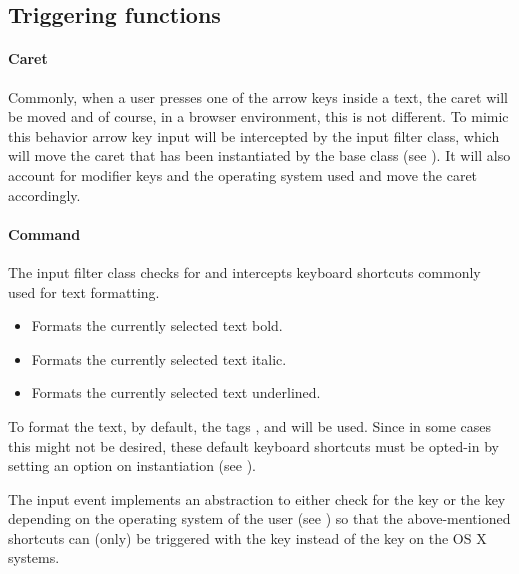 


\subsection{Triggering functions}

\paragraph{Caret} Commonly, when a user presses one of the arrow keys inside a text, the caret will be moved and of course, in a browser environment, this is not different. To mimic this behavior arrow key input will be intercepted by the  input filter class, which will move the caret that has been instantiated by the  base class (see ). It will also account for modifier keys and the operating system used and move the caret accordingly.


\paragraph{Command} The  input filter class checks for and intercepts keyboard shortcuts commonly used for text formatting. 

\begin{itemize}
\item {} Formats the currently selected text bold.
\item {} Formats the currently selected text italic. 
\item {} Formats the currently selected text underlined.
\end{itemize}

To format the text, by default, the tags ,  and  will be used. Since in some cases this might not be desired, these default keyboard shortcuts must be opted-in by setting an option on instantiation (see ).

The input event implements an abstraction to either check for the  key or the  key depending on the operating system of the user (see ) so that the above-mentioned shortcuts can (only) be triggered with the  key instead of the  key on the OS X systems.


